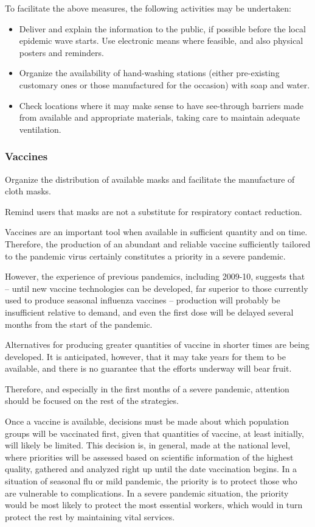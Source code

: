 \documentclass[12pt, a4]{scrartcl}
\begin{document}
To facilitate the above measures, the following activities may be undertaken:

\begin{itemize}
	\item Deliver and explain the information to the public, if possible before the local epidemic wave starts. Use electronic means where feasible, and also physical posters and reminders.
	\item Organize the availability of hand-washing stations (either pre-existing customary ones or those manufactured for the occasion) with soap and water.
	\item Check locations where it may make sense to have see-through barriers made from available and appropriate materials, taking care to maintain adequate ventilation.
\end{itemize}

\subsubsection{Vaccines}
Organize the distribution of available masks and facilitate the manufacture of cloth masks. 

Remind users that masks are not a substitute for respiratory contact reduction.

Vaccines are an important tool when available in sufficient quantity and on time. Therefore, the production of an abundant and reliable vaccine sufficiently tailored to the pandemic virus certainly constitutes a priority in a severe pandemic.

However, the experience of previous pandemics, including 2009-10, suggests that – until new vaccine technologies can be developed, far superior to those currently used to produce seasonal influenza vaccines – production will probably be insufficient relative to demand, and even the first dose will be delayed several months from the start of the pandemic.

Alternatives for producing greater quantities of vaccine in shorter times are being developed. It is anticipated, however, that it may take years for them to be available, and there is no guarantee that the efforts underway will bear fruit.

Therefore, and especially in the first months of a severe pandemic, attention should be focused on the rest of the strategies.

Once a vaccine is available, decisions must be made about which population groups will be vaccinated first, given that quantities of vaccine, at least initially, will likely be limited. This decision is, in general, made at the national level, where priorities will be assessed based on scientific information of the highest quality, gathered and analyzed right up until the date vaccination begins. In a situation of seasonal flu or mild pandemic, the priority is to protect those who are vulnerable to complications. In a severe pandemic situation, the priority would be most likely to protect the most essential workers, which would in turn protect the rest by maintaining vital services.
\end{document}
